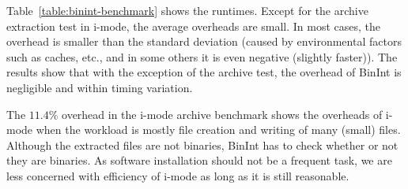 Table~\ref{table:binint-benchmark} shows the runtimes.
Except for the archive extraction test in i-mode,
the average overheads are small.
In most cases, the overhead is smaller than the standard deviation
(caused by environmental factors such as caches, etc., and in some
others it is even negative (slightly faster)).
The results show that with the exception of the archive test, 
the overhead of BinInt is negligible and within timing variation.

The $11.4\%$ overhead in the i-mode archive benchmark
shows the overheads of i-mode when the workload is mostly file creation
and writing of many (small) files.
Although the extracted files are not binaries, BinInt
has to check whether or not they are binaries.
As software installation should not be a frequent task,
we are less concerned with efficiency of
i-mode as long as it is still reasonable.

